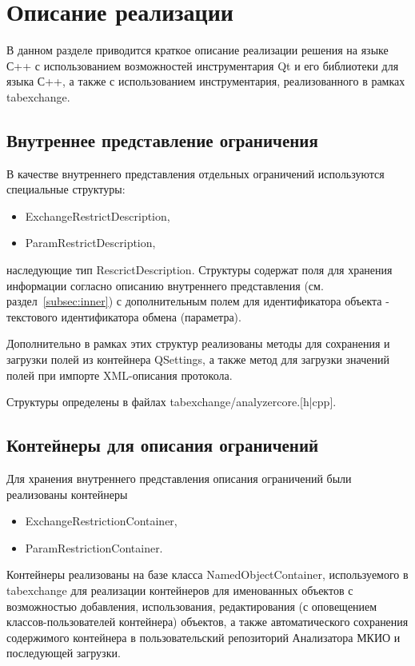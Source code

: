 \section{Описание реализации}

В данном разделе приводится краткое описание реализации решения на языке С++ с 
использованием возможностей инструментария Qt и его библиотеки для языка С++, а 
также с использованием инструментария, реализованного в рамках tabexchange.

\subsection{Внутреннее представление ограничения}

В качестве внутреннего представления отдельных ограничений используются 
специальные структуры: 

\begin{itemize}
 \item ExchangeRestrictDescription,
 \item ParamRestrictDescription,
\end{itemize}

наследующие тип RescrictDescription. Структуры содержат поля для хранения 
информации согласно описанию внутреннего представления (см. 
раздел~\ref{subsec:inner}) с дополнительным полем для идентификатора объекта - 
текстового идентификатора обмена (параметра).

Дополнительно в рамках этих структур реализованы методы для сохранения и 
загрузки полей из контейнера QSettings, а также метод для загрузки 
значений полей при импорте XML-описания протокола.

Структуры определены в файлах tabexchange/analyzercore.[h|cpp].

\subsection{Контейнеры для описания ограничений}

Для хранения внутреннего представления описания ограничений были реализованы 
контейнеры
\begin{itemize}
 \item ExchangeRestrictionContainer,
 \item ParamRestrictionContainer.
\end{itemize}

Контейнеры реализованы на базе класса NamedObjectContainer, используемого в 
tabexchange для реализации контейнеров для именованных объектов с возможностью 
добавления, использования, редактирования (с оповещением классов-пользователей 
контейнера) объектов, а также автоматического сохранения содержимого контейнера 
в пользовательский репозиторий Анализатора МКИО и последующей загрузки.

